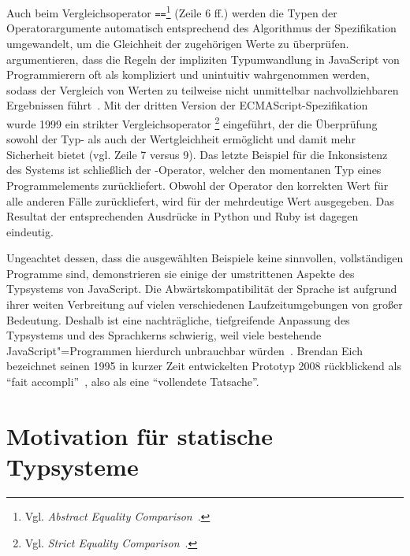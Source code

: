 Auch beim Vergleichsoperator \texttt{==}\footnote{Vgl. \textit{Abstract Equality Comparison}~\autocite[68]{ECMASCRIPT:2019}.} (Zeile 6 ff.) werden die Typen der Operatorargumente automatisch entsprechend des Algorithmus der Spezifikation umgewandelt, um die Gleichheit der zugehörigen Werte zu überprüfen. \citeauthor{PRADEL:2015} argumentieren, dass die Regeln der impliziten Typumwandlung in JavaScript von Programmierern oft als kompliziert und unintuitiv wahrgenommen werden, sodass der Vergleich von Werten zu teilweise nicht unmittelbar nachvollziehbaren Ergebnissen führt~\autocite{PRADEL:2015}.
Mit der dritten Version der ECMAScript-Spezifikation~\autocite{ECMASCRIPT:1999} wurde 1999 ein strikter Vergleichsoperator \code{===}\footnote{Vgl. \textit{Strict Equality Comparison}~\autocite[68]{ECMASCRIPT:2019}.} eingeführt, der die Überprüfung sowohl der Typ- als auch der Wertgleichheit ermöglicht und damit mehr Sicherheit bietet (vgl. Zeile 7 versus 9).
Das letzte Beispiel für die Inkonsistenz des Systems ist schließlich der -Operator, welcher den momentanen Typ eines Programmelements zurückliefert. Obwohl der Operator den korrekten Wert für alle anderen Fälle zurückliefert, wird für  der mehrdeutige Wert  ausgegeben. Das Resultat der entsprechenden Ausdrücke in Python und Ruby ist dagegen eindeutig.

Ungeachtet dessen, dass die ausgewählten Beispiele keine sinnvollen, vollständigen Programme sind, demonstrieren sie einige der umstrittenen Aspekte des Typsystems von JavaScript. Die Abwärtskompatibilität der Sprache ist aufgrund ihrer weiten Verbreitung auf vielen verschiedenen Laufzeitumgebungen von großer Bedeutung. Deshalb ist eine nachträgliche, tiefgreifende Anpassung des Typsystems und des Sprachkerns schwierig, weil viele bestehende JavaScript"=Programmen hierdurch unbrauchbar würden~\autocite[1]{CROCKFORD:JS_GOOD_PARTS}. Brendan Eich bezeichnet seinen 1995 in kurzer Zeit entwickelten Prototyp 2008 rückblickend als \enquote{fait accompli}~\autocite{EICH:POPULARITY}, also als eine \enquote{vollendete Tatsache}.

\section{Motivation für statische Typsysteme}

